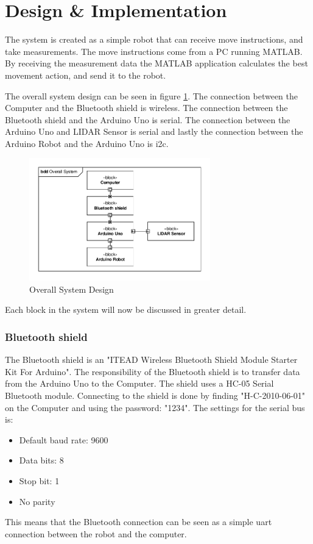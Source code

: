 \section{Design \& Implementation}
The system is created as a simple robot that can receive move instructions, and take measurements. The move instructions come from a PC running MATLAB. By receiving the measurement data the MATLAB application calculates the best movement action, and send it to the robot. 

The overall system design can be seen in figure \ref{fig:OSD}. The connection between the Computer and the Bluetooth shield is wireless. The connection between the Bluetooth shield and the Arduino Uno is serial. The connection between the Arduino Uno and LIDAR Sensor is serial and lastly the connection between the Arduino Robot and the Arduino Uno is i2c.
\begin{figure}[H]
\centering
\includegraphics[width=0.7\textwidth]{billeder/OverallSystemDesign}
\caption{Overall System Design}
\label{fig:OSD}
\end{figure}
Each block in the system will now be discussed in greater detail. 

\subsubsection{Bluetooth shield}
The Bluetooth shield is an "ITEAD Wireless Bluetooth Shield Module Starter Kit For Arduino"\cite{BTshield}\cite{BTshield2}. The responsibility of the Bluetooth shield is to transfer data from the Arduino Uno to the Computer. The shield uses a HC-05 Serial Bluetooth module. Connecting to the shield is done by finding "H-C-2010-06-01" on the Computer and using the password: "1234". The settings for the serial bus is:
\begin{itemize}
\item Default baud rate: 9600
\item Data bits: 8
\item Stop bit: 1
\item No parity
\end{itemize}
This means that the Bluetooth connection can be seen as a simple uart connection between the robot and the computer. 

